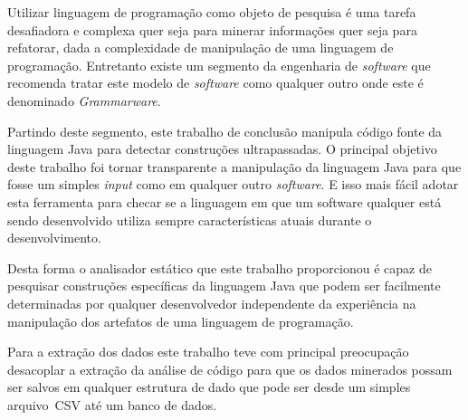 Utilizar linguagem de programação como objeto de pesquisa é uma tarefa desafiadora e complexa quer seja para minerar informações quer seja para refatorar, dada a complexidade de manipulação de uma linguagem de programação. Entretanto existe um segmento da engenharia de \textit{software} que recomenda tratar este modelo de \textit{software} como qualquer outro onde este é denominado \textit{Grammarware}. 

Partindo deste segmento, este trabalho de conclusão manipula código fonte da linguagem Java para detectar construções ultrapassadas. O principal objetivo deste trabalho foi tornar transparente a manipulação da linguagem Java para que fosse um simples \textit{input} como em qualquer outro \textit{software}. E isso mais fácil adotar esta ferramenta para checar se a linguagem em que um software qualquer está sendo desenvolvido utiliza sempre características atuais durante o desenvolvimento.

Desta forma o analisador estático que este trabalho proporcionou é capaz de pesquisar construções específicas da linguagem Java que podem ser facilmente determinadas por qualquer desenvolvedor independente da experiência na manipulação dos artefatos de uma linguagem de programação.

Para a extração dos dados este trabalho teve com principal preocupação desacoplar a extração da análise de código para que os dados minerados possam ser salvos em qualquer estrutura de dado que pode ser desde um simples arquivo~\acs{CSV} até um banco de dados.



